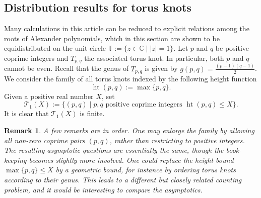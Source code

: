 \documentclass[table]{amsart}
\newtheorem{remark}[theorem]{Remark}
\newcommand{\op}[1]{\operatorname{#1}}
\numberwithin{equation}{section}
\begin{document}
\subsection{Distribution results for torus knots}
\par Many calculations in this article can be reduced to explicit relations among the roots of Alexander polynomials, which in this section are shown to be equidistributed on the unit circle $\mathbb{T}:=\{z\in \mathbb{C}\mid |z|=1\}$. Let $p$ and $q$ be positive coprime integers and $T_{p,q}$ the associated torus knot. In particular, both $p$ and $q$ cannot be even. Recall that the genus of $T_{p,q}$ is given by $g(p, q)=\frac{(p-1)(q-1)}{2}$. We consider the family of all torus knots indexed by the following height function 
\[\op{ht}(p,q):=\op{max}\{p,q\}.\] Given a positive real number $X$, set 
\[\mathcal{T}_1(X):= \{(p,q)\mid p, q\text{ positive coprime integers }\op{ht}(p, q)\leq X\}.\]It is clear that $\mathcal{T}_1(X)$ is finite. 

\begin{remark}
    A few remarks are in order. One may enlarge the family by allowing all non-zero coprime pairs $(p,q)$, rather than restricting to positive integers. The resulting asymptotic questions are essentially the same, though the book-keeping becomes slightly more involved. One could replace the height bound $\max\{p,q\}\le X$ by a geometric bound, for instance by ordering torus knots according to their genus. This leads to a different but closely related counting problem, and it would be interesting to compare the asymptotics.

\end{remark}
\end{document}
